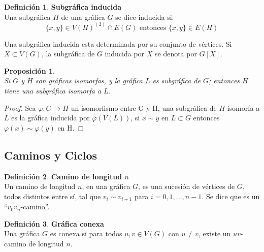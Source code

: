 \documentclass[12pt]{book}
\newtheorem{proposition}{Proposición}
\theoremstyle{definition}
\newtheorem{definition}{Definición}
\begin{document}
\begin{definition}\textbf{Subgráfica inducida}\\
  Una subgráfica $H$ de una gráfica $G$ se dice inducida si:
\begin{equation*}
\{x,y\}\in
  V(H)^{(2)}\cap E(G) \text{ entonces } \{x,y\}\in E(H)
\end{equation*}
\end{definition}

Una subgráfica inducida esta determinada por su conjunto de
vértices. Si $X\subset V(G)$, la subgráfica de $G$ inducida por $X$ se
denota por $G[X]$.

\begin{proposition}\textbf{}\\
  Si $G$ y $H$ son gráficas isomorfas, y la gráfica $L$ es subgráfica
  de $G$; entonces $H$ tiene una subgráfica isomorfa a $L$.
\end{proposition}

\begin{proof}
 Sea $\varphi : G \rightarrow H$ un isomorfismo entre G y
H, una subgráfica de $H$ isomorfa a $L$ es la gráfica inducida por
$\varphi (V(L))$, si $x\sim y$ en $L\subset G$ entonces $\varphi
(x)\sim \varphi (y)$ en H.
\end{proof}

\subsection{Caminos y Ciclos}



\begin{definition}\textbf{Camino de longitud $n$}\\
  Un camino de longitud $n$, en una gráfica $G$, es una sucesión de vértices de
  $G$, todos distintos entre sí, tal que $v_i\sim v_{i+1}$ para
  $i=0,1,...,n-1$. Se dice que es un
  ``$v_0v_n$-camino''.

\end{definition}


\begin{definition}\textbf{Gráfica conexa}\\
  Una gráfica $G$ es conexa si para todos $ u,v\in V(G)$ con $u\neq
  v$, existe un $uv$-camino de longitud $n$.
\end{definition}
\end{document}
